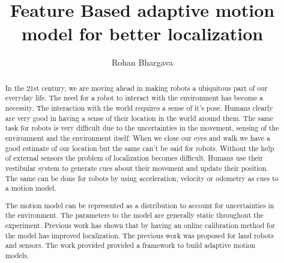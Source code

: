 \documentclass[12pt]{dalcsthesis}
\begin{document}
\mcs  %
\title{Feature Based adaptive motion model for better localization}
\author{Rohan Bhargava}


\providecommand{\tabularnewline}{\\}
\newcommand{\lyxdot}{.}

\frontmatter

\begin{abstract}
In the 21st century, we are moving ahead in making robots a ubiquitous part of our everyday life. The need for a robot to interact with the environment has become a necessity. The interaction with the world requires a sense of it's pose. Humans clearly are very good in having a sense of their location in the world around them. The same task for robots is very difficult due to the uncertainties in the movement, sensing of the environment and the environment itself. When we close our eyes and walk we have a good estimate of our location but the same can't be said for robots. Without the help of external sensors the problem of localization becomes difficult. Humans use their vestibular system to generate cues about their movement and update their position. The same can be done for robots by using acceleration, velocity or odometry as cues to a motion model. 

The motion model can be represented as a distribution to account for uncertainties in the environment. The parameters to the model are generally static throughout the experiment. Previous work has shown that by having an online calibration method for the model has improved localization. The previous work was proposed for land robots and sensors.  The work provided provided a framework to build adaptive motion models.


\end{abstract}
\end{document}
